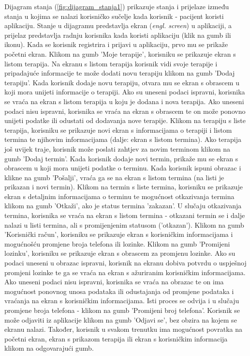 			
			Dijagram stanja (\ref{fig:dijagram_stanja1}) prikazuje stanja i prijelaze između stanja u kojima se nalazi korisničko sučelje kada korisnik - pacijent koristi aplikaciju. Stanje u dijagramu predstavlja ekran (\textit{engl. screen}) u aplikaciji, a prijelaz predstavlja radnju korisnika kada koristi aplikaciju (klik na gumb ili ikonu).
			Kada se korisnik registrira i prijavi u aplikaciju, prvo mu se prikaže početni ekran. Klikom na gumb 'Moje terapije', korisniku se prikazuje ekran s listom terapija. Na ekranu s listom terapija korisnik vidi svoje terapije i pripadajuće informacije te može dodati novu terapiju klikom na gumb 'Dodaj terapiju'. Kada korisnik dodaje novu terapiju, otvara mu se ekran s obrascem u koji mora unijeti informacije o terapiji. Ako su uneseni podaci ispravni, korisnika se vraća na ekran s listom terapija u koju je dodana i nova terapija. Ako uneseni podaci nisu ispravni, korisnika se vraća na ekran s obrascem te on može ponovno unijeti podatke ili odustati od dodavanja nove terapije. Klikom na terapiju s liste terapija, korisniku se prikazuje novi ekran s informacijama o terapiji i listom termina te njihovim informacijama (dalje: ekran s listom termina). Ako terapija još uvijek traje, korisnik može poslati zahtjev za novim terminom klikom na gumb 'Dodaj termin'. Kada korisnik dodaje novi termin, prikaže mu se ekran s obrascem u koji mora unijeti podatke o terminu. Kada korisnik ispuni obrazac i klikne na gumb 'Pošalji', vraća ga se na ekran s listom termina (na listi je prikazan i novi termin). Klikom na termin s liste termina, korisniku se prikazuje ekran s detaljnim informacijama o terminu te mogućnost otkazivanja termina klikom na gumb 'Otkaži', ako je status termina 'zakazan'. U slučaju otkazivanja termina, korisnika se vraća na ekran s listom termina - otkazani termin se i dalje nalazi u listi termina, ali s promijenjenim statusom ('otkazan'). Klikom na gumb 'Korisnički račun', korisniku se prikazuje ekran s korisničkim informacijama i mogućnošću promjene broja telefona ili lozinke. Klikom na gumb 'Promijeni lozinku', korisniku se prikazuje ekran s obrascem za promjenu lozinke. Ako su podaci uneseni u obrazac ispravni, korisnik na ekranu dobiva potvrdu o uspješnoj promjeni lozinke te ga se vraća na ekran s ažuriranim korisničkim informacijama. Ako uneseni podaci nisu ispravni, korisnika se vraća na obrazac te on ima mogućnost ponovnog unosa podataka ili odustajanja od promjene podataka i vraćanja na ekran s korisničkim informacijama. Isti proces se odvija i u slučaju promjene broja telefona - klikom na gumb 'Promijeni broj telefona'. Korisnik se može odjaviti iz aplikacije klikom na gumb 'Odjavi se', bez obzira na kojem se ekranu nalazi. Također, korisnik u svakom trenutku ima mogućnost povratka na početni ekran, ekran s prikazom terapija ili ekran s korisničkim informacija klikom na odgovarajući gumb.
			
